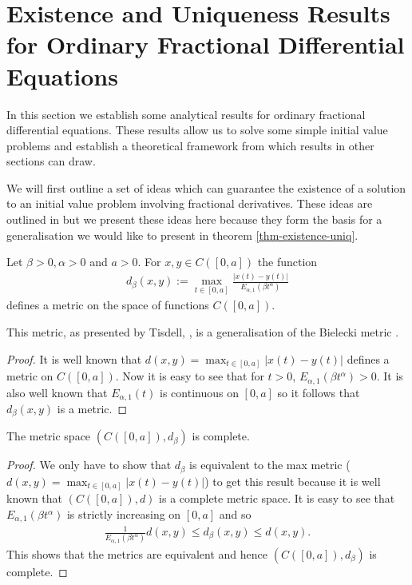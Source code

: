 \section{Existence and Uniqueness Results for Ordinary Fractional Differential Equations}
In this section we establish some analytical results for ordinary fractional differential equations. These results allow us to solve some simple initial value problems and establish a theoretical framework from which results in other sections can draw.

We will first outline a set of ideas which can guarantee the existence of a solution to an initial value problem involving fractional derivatives. These ideas are outlined in \cite{Tisdell2012} but we present these ideas here because they form the basis for a generalisation we would like to present in theorem \ref{thm-existence-uniq}.

\begin{mdframed}[innertopmargin=10pt]
\begin{propdef}
    Let $ \beta > 0, \alpha > 0 $ and $ a > 0 $. For $ x,y \in C([0,a]) $ the function
    \begin{align}
        d_{\beta}(x,y) := \max_{t \in [0,a]} \frac{|x(t) - y(t)|}{E_{\alpha,1}(\beta t^\alpha)}
    \end{align}
    defines a metric on the space of functions $ C([0,a]) $. 
\end{propdef}
\end{mdframed}

This metric, as presented by Tisdell, \cite{Tisdell2012}, is a generalisation of the Bielecki metric \cite{Tisdell2012, Bielecki1956}. 

\begin{proof}
    It is well known that $ d(x,y) = \max_{t \in [0,a]}|x(t) - y(t)| $ defines a metric on $C([0,a]) $. Now it is easy to see that for $ t > 0 $, $ E_{\alpha,1}(\beta t^\alpha) >0 $. It is also well known that $ E_{\alpha,1}(t) $ is continuous on $ [0, a] $ so it follows that $ d_{\beta}(x,y) $ is a metric.
\end{proof}

\begin{mdframed}[innertopmargin=10pt]
\begin{lemma}
    The metric space $ (C([0,a]), d_\beta) $ is complete.
\end{lemma}
\end{mdframed}
\begin{proof}
    We only have to show that $ d_\beta $ is equivalent to the max metric ($ d(x,y) = \max_{t \in [0,a]}|x(t) - y(t)| $) to get this result because it is well known that $ (C([0,a]), d) $ is a complete metric space.
    It is easy to see that $ E_{\alpha, 1}(\beta t^\alpha) $ is strictly increasing on $ [0, a] $ and so 
    \begin{align}
        \frac{1}{E_{\alpha, 1}(\beta t^\alpha)} d(x,y) \leq d_\beta(x,y) \leq d(x,y).
    \end{align}
    This shows that the metrics are equivalent and hence $ (C([0,a]), d_\beta) $ is complete.
\end{proof}

